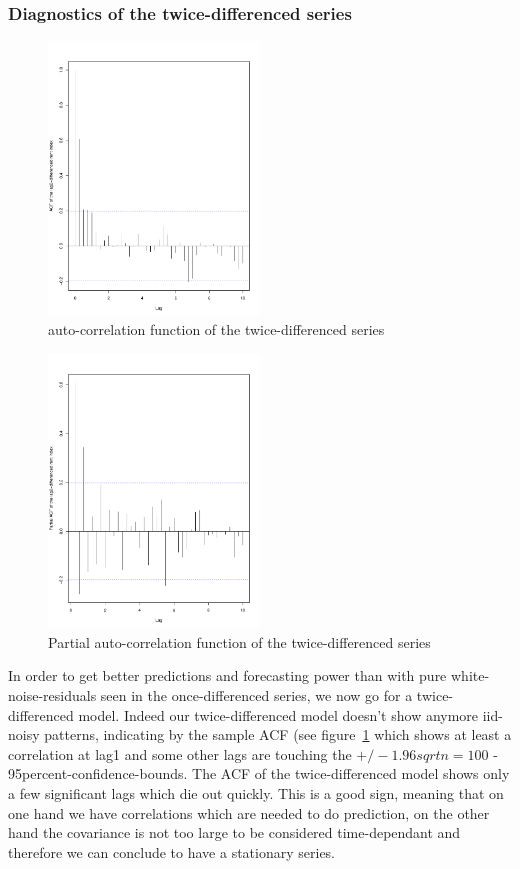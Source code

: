 \documentclass[11pt,a4paper]{article}
\begin{document}
\subsubsection{Diagnostics of the twice-differenced series}
\begin{figure}[!htb]
\centering
\includegraphics[angle=0,
width=0.5\textwidth]{diff2_acf}
\caption{auto-correlation function of the twice-differenced series
\label{fig:diff2_acf}}
\end{figure}
\begin{figure}[!htb]
\centering
\includegraphics[angle=0,
width=0.5\textwidth]{diff2_pacf}
\caption{Partial auto-correlation function of the twice-differenced series
\label{fig:diff2_pacf}}
\end{figure}
In order to get better predictions and forecasting power than with pure white-noise-residuals seen in the once-differenced series, we now go for a twice-differenced model. Indeed our twice-differenced model doesn't show anymore iid-noisy patterns, indicating by the sample ACF (see figure~\ref{fig:diff2_acf} which shows at least a correlation at lag1 and some other lags are touching the $+/-1.96sqrt{n=100}$ - 95percent-confidence-bounds. The ACF of the twice-differenced model shows only a few significant lags which die out quickly. This is a good sign, meaning that on one hand we have correlations which are needed to do prediction, on the other hand the covariance is not too large to be considered time-dependant and therefore we can conclude to have a stationary series.
\end{document}
